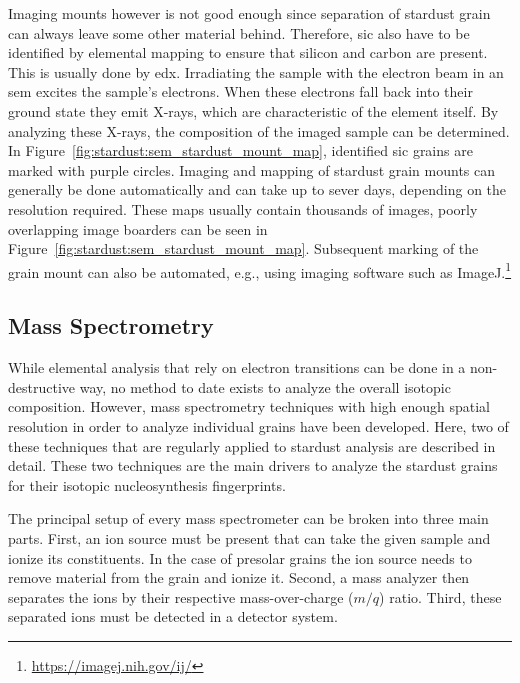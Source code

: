 Imaging mounts however is not good enough since separation of stardust grain can always leave some other material behind. Therefore, \ac{sic} also have to be identified by elemental mapping to ensure that silicon and carbon are present. This is usually done by \acf{edx}. Irradiating the sample with the electron beam in an \ac{sem} excites the sample's electrons. When these electrons fall back into their ground state they emit X-rays, which are characteristic of the element itself. By analyzing these X-rays, the composition of the imaged sample can be determined. In Figure~\ref{fig:stardust:sem_stardust_mount_map}, identified \ac{sic} grains are marked with purple circles. Imaging and mapping of stardust grain mounts can generally be done automatically and can take up to sever days, depending on the resolution required. These maps usually contain thousands of images, poorly overlapping image boarders can be seen in Figure~\ref{fig:stardust:sem_stardust_mount_map}. Subsequent marking of the grain mount can also be automated, e.g., using imaging software such as ImageJ.\footnote{\url{https://imagej.nih.gov/ij/}}


\subsection{Mass Spectrometry}

While elemental analysis that rely on electron transitions can be done in a non-destructive way, no method to date exists to analyze the overall isotopic composition. However, mass spectrometry techniques with high enough spatial resolution in order to analyze individual grains have been developed. Here, two of these techniques that are regularly applied to stardust analysis are described in detail. These two techniques are the main drivers to analyze the stardust grains for their isotopic nucleosynthesis fingerprints.

The principal setup of every mass spectrometer can be broken into three main parts. First, an ion source must be present that can take the given sample and ionize its constituents. In the case of presolar grains the ion source needs to remove material from the grain and ionize it. Second, a mass analyzer then separates the ions by their respective mass-over-charge ($m/q$) ratio. Third, these separated ions must be detected in a detector system.


